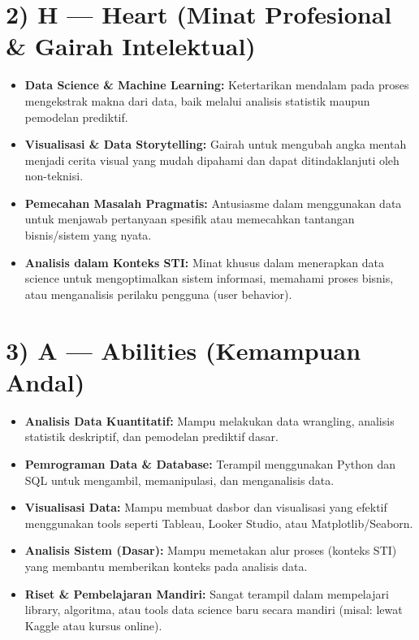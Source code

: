\documentclass[
  letterpaper,
  DIV=11,
  numbers=noendperiod]{scrreprt}
\providecommand{\tightlist}{%
  \setlength{\itemsep}{0pt}\setlength{\parskip}{0pt}}
\begin{document}
\section{2) H --- Heart (Minat Profesional \& Gairah
Intelektual)}\label{h-heart-minat-profesional-gairah-intelektual}

\begin{itemize}
\tightlist
\item
  \textbf{Data Science \& Machine Learning:} Ketertarikan mendalam pada
  proses mengekstrak makna dari data, baik melalui analisis statistik
  maupun pemodelan prediktif.
\item
  \textbf{Visualisasi \& Data Storytelling:} Gairah untuk mengubah angka
  mentah menjadi cerita visual yang mudah dipahami dan dapat
  ditindaklanjuti oleh non-teknisi.
\item
  \textbf{Pemecahan Masalah Pragmatis:} Antusiasme dalam menggunakan
  data untuk menjawab pertanyaan spesifik atau memecahkan tantangan
  bisnis/sistem yang nyata.
\item
  \textbf{Analisis dalam Konteks STI:} Minat khusus dalam menerapkan
  data science untuk mengoptimalkan sistem informasi, memahami proses
  bisnis, atau menganalisis perilaku pengguna (user behavior).
\end{itemize}

\section{3) A --- Abilities (Kemampuan
Andal)}\label{a-abilities-kemampuan-andal}

\begin{itemize}
\tightlist
\item
  \textbf{Analisis Data Kuantitatif:} Mampu melakukan data wrangling,
  analisis statistik deskriptif, dan pemodelan prediktif dasar.
\item
  \textbf{Pemrograman Data \& Database:} Terampil menggunakan Python dan
  SQL untuk mengambil, memanipulasi, dan menganalisis data.
\item
  \textbf{Visualisasi Data:} Mampu membuat dasbor dan visualisasi yang
  efektif menggunakan tools seperti Tableau, Looker Studio, atau
  Matplotlib/Seaborn.
\item
  \textbf{Analisis Sistem (Dasar):} Mampu memetakan alur proses (konteks
  STI) yang membantu memberikan konteks pada analisis data.
\item
  \textbf{Riset \& Pembelajaran Mandiri:} Sangat terampil dalam
  mempelajari library, algoritma, atau tools data science baru secara
  mandiri (misal: lewat Kaggle atau kursus online).
\end{itemize}
\end{document}
